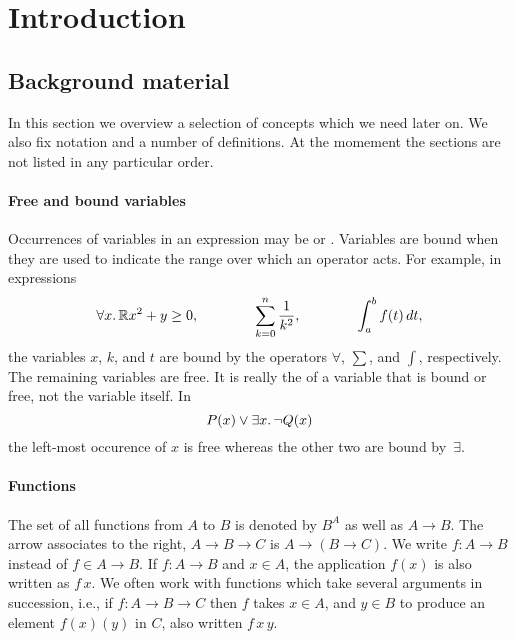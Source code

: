 \chapter{Introduction}
\label{chap:introduction}

\section{Background material}
\label{sec:background-material}

In this section we overview a selection of concepts which we need
later on. We also fix notation and a number of definitions. At the
momement the sections are not listed in any particular order.

\subsubsection*{Free and bound variables}

Occurrences of variables in an expression may be  or
. Variables are bound when they are used to indicate the
range over which an operator acts. For example, in expressions
%
\begin{equation*}
  \forall x .\,{\mathbb{R}}{x^2 + y \geq 0},
  \qquad\qquad
  \sum_{k = 0}^n \frac{1}{k^2},
  \qquad\qquad
  \int_a^b f(t) \, dt,
\end{equation*}
%
the variables $x$, $k$, and $t$ are bound by the operators $\forall$,
$\sum$, and $\int$, respectively. The remaining variables are free. It
is really the  of a variable that is bound or free,
not the variable itself. In
%
\begin{equation*}
  P(x) \lor \exists x .\, \lnot Q(x)
\end{equation*}
%
the left-most occurence of $x$ is free whereas the other two are bound
by~$\exists$.

\subsubsection*{Functions}

The set of all functions from $A$ to $B$ is denoted by $B^A$ as well as $A \to B$. The arrow associates to the right,
$A \to B \to C$ is $A \to (B \to C)$. We write $f : A \to B$ instead of $f \in A \to B$. If $f : A \to B$ and $x \in A$, the application $f(x)$ is also written as $f\, x$. We often work with  functions which take several
arguments in succession, i.e., if $f : A \to B \to C$ then $f$ takes $x \in A$, and $y \in B$ to produce an element
$f(x)(y)$ in $C$, also written $f\, x\, y$.


